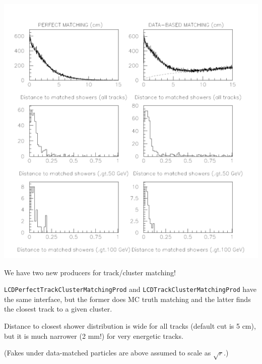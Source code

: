 \documentclass[landscape]{article}
\begin{document}
\large
\renewcommand{\labelitemi}{-}
\setlength{\parindent}{0 cm}

\begin{center} \includegraphics[height=0.8\textheight]{mcvsdata_matching.pdf} \end{center}

We have two new producers for track/cluster matching!

\vspace{0.2 cm}
{\tt LCDPerfectTrackClusterMatchingProd} and {\tt LCDTrackClusterMatchingProd}
have the same interface, but the former does MC truth matching and the
latter finds the closest track to a given cluster.

\vspace{0.2 cm}
Distance to closest shower distribution is wide for all tracks
(default cut is 5 cm), but it is much narrower (2 mm!) for very
energetic tracks.

\vspace{0.2 cm}
(Fakes under data-matched particles are above assumed to scale as $\sqrt{r}$.)

\pagebreak
\end{document}
